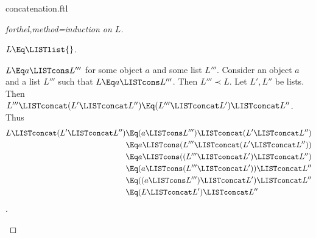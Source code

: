 \documentclass[lang=en,debug=all]{stex}
\begin{document}
\begin{smodule}{concatenation.ftl}
\begin{proof}[forthel,method=induction on $L$]
  \begin{case}{$L \Eq \LISTlist{}$.} \end{case}

  \begin{case}{$L \Eq a \LISTcons L'''$ for some object $a$ and some list $L'''$.}
    Consider an object $a$ and a list $L'''$ such that $L \Eq a \LISTcons L'''$.
    Then $L''' \prec L$.
    Let $L',L''$ be lists.
    Then $L''' \LISTconcat (L' \LISTconcat L'') \Eq (L''' \LISTconcat L') \LISTconcat L''$.
    Thus
    \begin{align*}
      L \LISTconcat (L' \LISTconcat L'') 
        &\Eq (a \LISTcons L''') \LISTconcat (L' \LISTconcat L'')\\
        &\Eq a \LISTcons (L''' \LISTconcat (L' \LISTconcat L''))\\
        &\Eq a \LISTcons ((L''' \LISTconcat L') \LISTconcat L'')\\
        &\Eq (a \LISTcons (L''' \LISTconcat L')) \LISTconcat L''\\
        &\Eq ((a \LISTcons L''') \LISTconcat L') \LISTconcat L''\\
        &\Eq (L \LISTconcat L') \LISTconcat L''
    \end{align*}.
  \end{case}
\end{proof}
\end{smodule}
\end{document}
